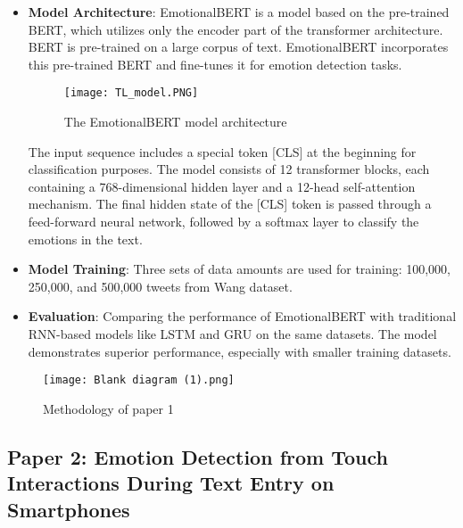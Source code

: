 \documentclass[12pt]{article} %
\begin{document}
\begin{itemize}
    \item \textbf{Model Architecture}:
    EmotionalBERT is a model based on the pre-trained BERT, which utilizes only the encoder part of the transformer architecture. BERT is pre-trained on a large corpus of text. EmotionalBERT incorporates this pre-trained BERT and fine-tunes it for emotion detection tasks.                                                                                                     
    \begin{figure}[h!]
    \centering
    \texttt{[image: TL\_model.PNG]}                    
    \caption{The EmotionalBERT model architecture}
    \label{fig:emotionalbert}
    \end{figure}                                         
  
    The input sequence includes a special token [CLS]                    
   at the beginning for classification purposes. The model consists of 12 transformer blocks, each containing a 768-dimensional hidden layer and a 12-head self-attention mechanism. The final hidden state of the [CLS] token is passed through a feed-forward neural network, followed by a softmax layer to classify the emotions in the text.
\end{itemize}      
\begin{itemize}
    \item \textbf{Model Training}:
    Three sets of data amounts are used for training: 100,000, 250,000, and 500,000 tweets from Wang dataset.
\end{itemize}
\begin{itemize}
    \item \textbf{Evaluation}:
    Comparing the performance of EmotionalBERT with traditional RNN-based models like LSTM and GRU on the same datasets. The model demonstrates superior performance, especially with smaller training datasets.
\end{itemize}

    \begin{figure}[h!]
    \centering
    \texttt{[image: Blank diagram (1).png]}                    
    \caption{Methodology of paper 1 }                      
    \label{fig:Methodology of paper1}
    \end{figure}
\newpage

\subsection{Paper 2: Emotion Detection from Touch Interactions During Text Entry on Smartphones}
\end{document}
